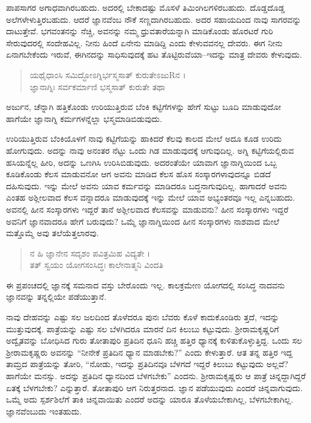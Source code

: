 ಪಾಪಸಾಗರ ಅಗಾಧವಾಗಿರಬಹುದು. ಅದರಲ್ಲಿ ಬೇಕಾದಷ್ಟು ಮೊಸಳೆ ತಿಮಿಂಗಿಲಗಳಿರಬಹುದು. ದೊಡ್ಡದೊಡ್ಡ ಅಲೆಗಳೇಳುತ್ತಿರಬಹುದು. ಆದರೆ ಜ್ಞಾನವೆಂಬ ನೌಕೆ ಸಣ್ಣದಾಗಿರಬಹುದು. ಅದರ ಸಹಾಯದಿಂದ ನಾವು ಸಾಗರವನ್ನು ದಾಟುತ್ತೇವೆ. ಭಗವಂತನನ್ನು ನೆಚ್ಚಿ, ಅವನನ್ನು ನಮ್ಮ ಧ್ರುವತಾರೆಯನ್ನಾಗಿ ಮಾಡಿಕೊಂಡು ಹೊರಟರೆ ಗುರಿ ಸೇರುವುದರಲ್ಲಿ ಸಂದೇಹವಿಲ್ಲ. ನೀನು ಹಿಂದೆ ಏನೇನು ಮಾಡಿದ್ದಿ ಎಂದು ಕೇಳುವವನಲ್ಲ ದೇವರು. ಈಗ ನೀನು ಏನಾಗಬೇಕೆಂದು ಇರುವೆ, ಈಗಿನದನ್ನು ಸಾಧಿಸುವುದಕ್ಕೆ ಹಟ ತೊಟ್ಟಿರುವೆಯಾ–ಇದನ್ನು ಮಾತ್ರ ದೇವರು ಕೇಳುವುದು.

\begin{verse}
ಯಥೈಧಾಂಸಿ ಸಮಿದ್ಧೋಽಗ್ನಿರ್ಭಸ್ಮಸಾತ್ ಕುರುತೇಽಜುRನ ।\\ಜ್ಞಾನಾಗ್ನಿಃ ಸರ್ವಕರ್ಮಾಣಿ ಭಸ್ಮಸಾತ್ ಕುರುತೇ ತಥಾ 
\end{verse}

{\small ಅರ್ಜುನ, ಚೆನ್ನಾಗಿ ಹತ್ತಿಕೊಂಡು ಉರಿಯುತ್ತಿರುವ ಬೆಂಕಿ ಕಟ್ಟಿಗೆಗಳನ್ನು ಹೇಗೆ ಸುಟ್ಟು ಬೂದಿ ಮಾಡುವುದೋ ಹಾಗೆಯೇ ಜ್ಞಾನಾಗ್ನಿ ಕರ್ಮಗಳನ್ನೆಲ್ಲಾ ಭಸ್ಮಮಾಡಿಬಿಡುವುದು.}

ಉರಿಯುತ್ತಿರುವ ಬೆಂಕಿಯೊಳಗೆ ನಾವು ಕಟ್ಟಿಗೆಯನ್ನು ಹಾಕಿದರೆ ಕೆಲವು ಕಾಲದ ಮೇಲೆ ಅದೂ ಕೂಡ ಉರಿದು ಹೋಗುವುದು. ಅದನ್ನು ನಾವು ಅನಂತರ ನೆಟ್ಟು ಒಂದು ಗಿಡ ಮಾಡುವುದಕ್ಕೆ ಆಗುವುದಿಲ್ಲ. ಅಗ್ನಿ ಕಟ್ಟಿಗೆಯಲ್ಲಿರುವ ಹಸಿಯನ್ನೆಲ್ಲ ಹೀರಿ, ಅದನ್ನು ಒಣಗಿಸಿ ಉರಿಸಿಬಿಡುವುದು. ಅದರಂತೆಯೇ ಯಾವಾಗ ಜ್ಞಾನಾಗ್ನಿಯಿಂದ ಒಬ್ಬ ಕೂಡಿಕೊಂಡು ಕೆಲಸ ಮಾಡುವನೋ ಆಗ ಅವನು ಮಾಡಿದ ಕೆಲಸ ಹೊಸ ಸಂಸ್ಕಾರಗಳಾವುದನ್ನೂ ಬಿಡದೆ ದಹಿಸುವುದು. ಇನ್ನು ಮೇಲೆ ಅವನು ಯಾವ ಕರ್ಮವನ್ನು ಮಾಡಿದರೂ ಬದ್ಧನಾಗುವುದಿಲ್ಲ. ಹಾಗಾದರೆ ಅವನು ಎಂತಹ ಅಶ್ಲೀಲವಾದ ಕೆಲಸ ವನ್ನಾದರೂ ಮಾಡುವುದಕ್ಕೆ ಇನ್ನು ಮೇಲೆ ಯಾವ ಅಭ್ಯಂತರವೂ ಇಲ್ಲ ಎನ್ನಬಹುದು. ಅವನಲ್ಲಿ ಹೀನ ಸಂಸ್ಕಾರಗಳು ಇದ್ದರೆ ತಾನೆ ಅಶ್ಲೀಲವಾದ ಕೆಲಸವನ್ನು ಮಾಡುವನು? ಹೀನ ಸಂಸ್ಕಾರಗಳು ಇದ್ದರೆ ಅವನಿಗೆ ಜ್ಞಾನವಾದರೂ ಹೇಗೆ ಬರುವುದು? ಒಮ್ಮೆ ಜ್ಞಾನಾಗ್ನಿಯಿಂದ ಹೀನ ಸಂಸ್ಕಾರಗಳು ನಾಶವಾದ ಮೇಲೆ ಮತ್ತೊಮ್ಮೆ ಅವು ತಲೆಯೆತ್ತಲಾರವು.

\begin{verse}
ನ ಹಿ ಜ್ಞಾನೇನ ಸದೃಶಂ ಪವಿತ್ರಮಿಹ ವಿದ್ಯತೇ ।\\ತತ್ ಸ್ವಯಂ ಯೋಗಸಂಸಿದ್ಧಃ ಕಾಲೇನಾತ್ಮನಿ ವಿಂದತಿ 
\end{verse}

{\small ಈ ಪ್ರಪಂಚದಲ್ಲಿ ಜ್ಞಾನಕ್ಕೆ ಸಮನಾದ ವಸ್ತು ಬೇರೊಂದು ಇಲ್ಲ. ಕಾಲಕ್ರಮೇಣ ಯೋಗದಲ್ಲಿ ಸಂಸಿದ್ಧ ನಾದವನು ಜ್ಞಾನವನ್ನು ತನ್ನಲ್ಲಿಯೇ ಪಡೆಯುತ್ತಾನೆ.}

ನಾವು ದೇಹವನ್ನು ಎಷ್ಟು ಸಲ ಜಲದಿಂದ ತೊಳೆದರೂ ಪುನಃ ಬೆವರು ಕೊಳೆ ಕಾದುಕೊಂಡಿರು ತ್ತದೆ, ಇದನ್ನು ಮುತ್ತುವುದಕ್ಕೆ. ಪಾತ್ರೆಯನ್ನು ಎಷ್ಟು ಸಲ ಬೆಳಗಿದರೂ ಮಾರನೆ ದಿನ ಕಿಲುಬು ಕಟ್ಟುವುದು. ಶ್ರೀರಾಮಕೃಷ್ಣರಿಗೆ ಅದ್ವೈತವನ್ನು ಬೋಧಿಸಿದ ಗುರು ತೋತಾಪುರಿ ಪ್ರತಿದಿನ ಧೂನಿ ಹಚ್ಚಿ ಹತ್ತಿರ ಧ್ಯಾನಕ್ಕೆ ಕುಳಿತುಕೊಳ್ಳುತ್ತಿದ್ದ. ಒಂದು ಸಲ ಶ್ರೀರಾಮಕೃಷ್ಣರು ಅವನನ್ನು “ನೀನೇಕೆ ಪ್ರತಿದಿನ ಧ್ಯಾನ ಮಾಡಬೇಕು?” ಎಂದು ಕೇಳುತ್ತಾರೆ. ಆತ ತನ್ನ ಹತ್ತಿರ ಇದ್ದ ತಾಮ್ರದ ಪಾತ್ರೆಯನ್ನು ತೋರಿ, “ನೋಡು, ಇದನ್ನು ಪ್ರತಿದಿನವೂ ಬೆಳಗದೆ ಇದ್ದರೆ ಕಿಲುಬು ಕಟ್ಟುವುದು ಅಲ್ಲವೆ? ಹಾಗೆಯೇ ಮನಸ್ಸು. ಅದನ್ನು ಪ್ರತಿದಿನ ಧ್ಯಾನದಿಂದ ಬೆಳಗಬೇಕು” ಎಂದನು. ಶ್ರೀರಾಮಕೃಷ್ಣರು ಆ ಪಾತ್ರೆ ಚಿನ್ನದ್ದಾಗಿದ್ದರೆ ಏತಕ್ಕೆ ಬೆಳಗಬೇಕು? ಎನ್ನುತ್ತಾರೆ. ತೋತಾಪುರಿ ಆಗ ನಿರುತ್ತರನಾದ. ಜ್ಞಾನ ಪಡೆಯುವುದು ಎಂದರೆ ಚಿನ್ನವಾಗುವುದು. ಒಮ್ಮೆ ಅದು ಸ್ಪರ್ಶಶಿಲೆಗೆ ತಾಕಿ ಚಿನ್ನವಾಯಿತು ಎಂದರೆ ಅದನ್ನು ಯಾರೂ ತೊಳೆಯಬೇಕಾಗಿಲ್ಲ, ಬೆಳಗಬೇಕಾಗಿಲ್ಲ. ಜ್ಞಾನವೆಂಬುದು ಇಂತಹುದು.

